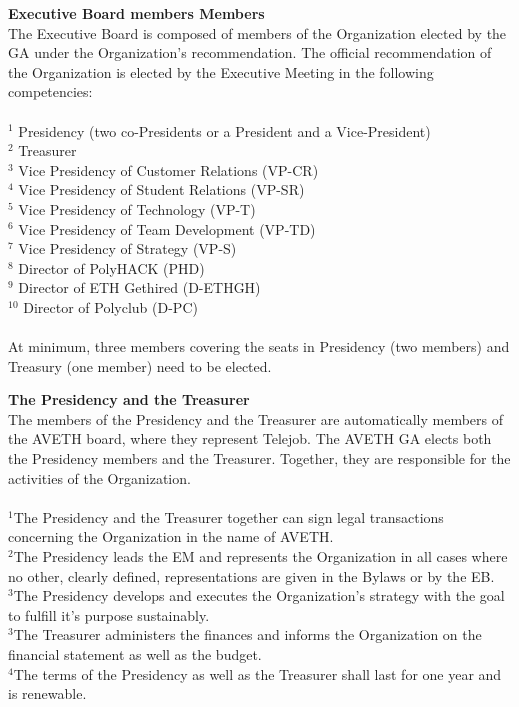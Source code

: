 \documentclass[10pt]{article}
\newcounter{qcounter}
\begin{document}
\begin{list}{{\bf Article :~}}{}
\item {\bf Executive Board members Members}\\
The Executive Board is composed of members of the Organization elected by the GA under the Organization's recommendation. The official recommendation of the Organization is elected by the Executive Meeting in the following competencies:\\ \\
$^{1}$ Presidency (two co-Presidents or a President and a Vice-President)\\
$^{2}$ Treasurer\\
$^{3}$ Vice Presidency of Customer Relations (VP-CR)\\
$^{4}$ Vice Presidency of Student Relations (VP-SR)\\
$^{5}$ Vice Presidency of Technology (VP-T)\\
$^{6}$ Vice Presidency of Team Development (VP-TD)\\
$^{7}$ Vice Presidency of Strategy (VP-S)\\
$^{8}$ Director of PolyHACK (PHD)\\
$^{9}$ Director of ETH Gethired (D-ETHGH)\\
$^{10}$ Director of Polyclub (D-PC)\\\\
At minimum, three members covering the seats in Presidency (two members) and Treasury (one member) need to be elected. 

\item {\bf The Presidency and the Treasurer}\label{P&T}\\
The members of the Presidency and the Treasurer are automatically members of the AVETH board, where they represent Telejob. The AVETH GA elects both the Presidency members and the Treasurer. Together, they are responsible for the activities of the Organization. \\\\
$^{1}$The Presidency and the Treasurer together can sign legal transactions concerning the Organization in the name of AVETH.\\
$^{2}$The Presidency leads the EM and represents the Organization in all cases where no other, clearly defined, representations are given in the Bylaws or by the EB. \\
$^{3}$The Presidency develops and executes the Organization's strategy with the goal to fulfill it's purpose sustainably.\\
$^{3}$The Treasurer administers the finances and informs the Organization on the financial statement as well as the budget.\\
$^{4}$The terms of the Presidency as well as the Treasurer shall last for one year and is renewable.


\end{list}
\end{document}
